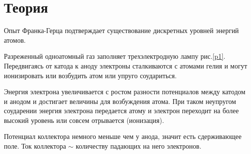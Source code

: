 \documentclass[a4paper]{article}
\begin{document}
\section{Теория}

Опыт Франка-Герца подтверждает существование дискретных уровней энергий атомов.

Разреженный одноатомный газ заполняет трехэлектродную лампу рис.\ref{p1}. Передвигаясь от катода к аноду 
электроны сталкиваются с атомами гелия и могут ионизировать или возбудить атом или упруго соудариться.

Энергия электрона увеличивается с ростом разности потенциалов между катодом и анодом и достигает 
величины для возбуждения атома. При таком неупругом соударении энергия электрона передается атому 
и электрон переходит на более высокий уровень или совсем отрывается (ионизация).

Потенциал коллектора немного меньше чем у анода, значит есть сдерживающее поле. Ток коллектора $\sim$ 
количеству падающих на него электронов.
\end{document}
